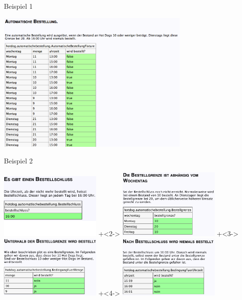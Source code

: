 \begin{frame}{Beispiel 1}

\begin{center}
\includegraphics[height=7cm]{SchlechtesBeispiel.png} \newline
\end{center}

\end{frame}

\begin{frame}{Beispiel 2}

\begin{center}
\includegraphics[width=5cm]{bestellschluss.png}
\hfill{}
\onslide+<2->
\includegraphics[width=5cm]{wochentag.png}
 \newline
\onslide+<3->
\includegraphics[width=5cm]{bestellgrenze.png}
\hfill{}
\onslide+<4->
\includegraphics[width=5cm]{keineBestellungNachBestellschluss.png} 
\end{center}

\end{frame}

